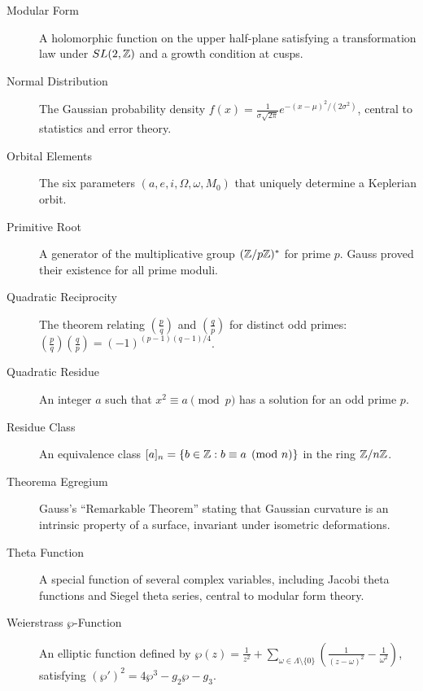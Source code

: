 \begin{description}
\item[Modular Form] A holomorphic function on the upper half-plane satisfying a transformation law under $SL(2,\mathbb{Z})$ and a growth condition at cusps.

\item[Normal Distribution] The Gaussian probability density $f(x) = \frac{1}{\sigma\sqrt{2\pi}} e^{-(x-\mu)^2/(2\sigma^2)}$, central to statistics and error theory.

\item[Orbital Elements] The six parameters $(a, e, i, \Omega, \omega, M_0)$ that uniquely determine a Keplerian orbit.

\item[Primitive Root] A generator of the multiplicative group $(\mathbb{Z}/p\mathbb{Z})^*$ for prime $p$. Gauss proved their existence for all prime moduli.

\item[Quadratic Reciprocity] The theorem relating $\left(\frac{p}{q}\right)$ and $\left(\frac{q}{p}\right)$ for distinct odd primes: $\left(\frac{p}{q}\right)\left(\frac{q}{p}\right) = (-1)^{(p-1)(q-1)/4}$.

\item[Quadratic Residue] An integer $a$ such that $x^2 \equiv a \pmod{p}$ has a solution for an odd prime $p$.

\item[Residue Class] An equivalence class $[a]_n = \{b \in \mathbb{Z} : b \equiv a \pmod{n}\}$ in the ring $\mathbb{Z}/n\mathbb{Z}$.

\item[Theorema Egregium] Gauss's ``Remarkable Theorem'' stating that Gaussian curvature is an intrinsic property of a surface, invariant under isometric deformations.

\item[Theta Function] A special function of several complex variables, including Jacobi theta functions and Siegel theta series, central to modular form theory.

\item[Weierstrass $\wp$-Function] An elliptic function defined by $\wp(z) = \frac{1}{z^2} + \sum_{\omega \in \Lambda\setminus\{0\}} \left(\frac{1}{(z-\omega)^2} - \frac{1}{\omega^2}\right)$, satisfying $(\wp')^2 = 4\wp^3 - g_2\wp - g_3$.

\end{description}

